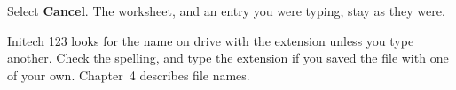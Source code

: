 \Solution Select \textbf{Cancel}.  The worksheet, and an entry you were
typing, stay as they were.

\Solution Initech 123 looks for the name on drive  with the
extension  unless you type another.  Check the spelling, and
type the extension if you saved the file with one of your own.  Chapter~4
describes file names.
